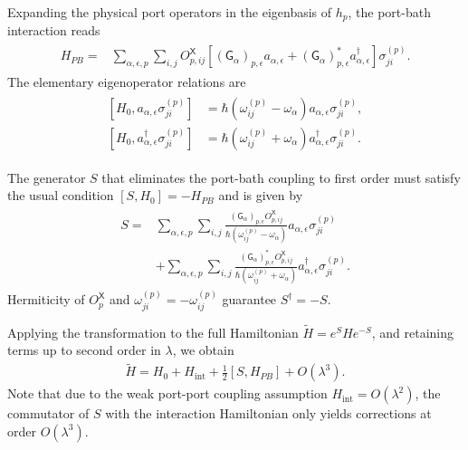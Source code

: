 \documentclass[prx,aps,twocolumn,article]{revtex4-2}
\newcommand{\msf}[1]{\mathsf{#1}}
\newcommand{\msG}{\msf{G}}
\newcommand{\msX}{\msf{X}}
\begin{document}
Expanding the physical port operators in the eigenbasis of $h_p$, the port-bath interaction reads
\begin{align}
\begin{aligned}
    H_{PB}
    ={}&
    \sum_{\alpha,\epsilon,p}
    \sum_{i,j}
    O_{p,ij}^{\msX}
    \left[
        (\msG_\alpha)_{p,\epsilon}
        a_{\alpha,\epsilon}
        +
        (\msG_\alpha)_{p,\epsilon}^*
        a_{\alpha,\epsilon}^\dagger
    \right]
    \sigma_{ji}^{(p)}.
\end{aligned}
\label{Eq:AppendixSWInteractionExpanded}
\end{align}
The elementary eigenoperator relations are
\begin{align}
\begin{aligned}
    [H_0,
    a_{\alpha,\epsilon}
    \sigma_{ji}^{(p)}]
    &=
    \hbar
    \left(
        \omega_{ij}^{(p)}
        -
        \omega_\alpha
    \right)
    a_{\alpha,\epsilon}
    \sigma_{ji}^{(p)},
    \\
    [H_0,
    a_{\alpha,\epsilon}^\dagger
    \sigma_{ji}^{(p)}]
    &=
    \hbar
    \left(
        \omega_{ij}^{(p)}
        +
        \omega_\alpha
    \right)
    a_{\alpha,\epsilon}^\dagger
    \sigma_{ji}^{(p)}.
\end{aligned}
\end{align}

The generator $S$ that eliminates the port-bath coupling to first order must satisfy the usual condition $[S,H_0]=-H_{PB}$ and is given by
\begin{align}
\begin{aligned}
    S
    ={}&
    \sum_{\alpha,\epsilon,p}
    \sum_{i,j}
    \frac{
        (\msG_\alpha)_{p,\epsilon}
        O_{p,ij}^{\msX}
    }{
        \hbar
        \left(
            \omega_{ij}^{(p)}
            -
            \omega_\alpha
        \right)
    }
    a_{\alpha,\epsilon}
    \sigma_{ji}^{(p)}
    \\
    &+
    \sum_{\alpha,\epsilon,p}
    \sum_{i,j}
    \frac{
        (\msG_\alpha)_{p,\epsilon}^*
        O_{p,ij}^{\msX}
    }{
        \hbar
        \left(
            \omega_{ij}^{(p)}
            +
            \omega_\alpha
        \right)
    }
    a_{\alpha,\epsilon}^\dagger
    \sigma_{ji}^{(p)}.
\end{aligned}
\label{Eq:AppendixSWGenerator}
\end{align}
Hermiticity of $O_p^{\msX}$ and
$\omega_{ji}^{(p)}=-\omega_{ij}^{(p)}$ guarantee $S^\dagger=-S$.


Applying the transformation to the full Hamiltonian $\tilde{H}=e^SHe^{-S}$, and retaining terms up to second order in $\lambda$, we obtain 
\begin{align}
    \tilde{H} = H_0 + H_{\mathrm{int}}  + \frac12[S,H_{PB}] +
    O(\lambda^3).
\label{Eq:AppendixSWSecondOrderHamiltonian}
\end{align}
Note that due to the weak port-port coupling assumption $H_{\mathrm{int}}=O(\lambda^2)$, the commutator of $S$ with the interaction Hamiltonian only yields corrections at order $O(\lambda^3)$.
\end{document}
